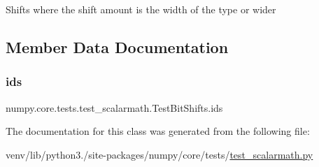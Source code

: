 \begin{DoxyVerb}Shifts where the shift amount is the width of the type or wider \end{DoxyVerb}
 

\subsection{Member Data Documentation}
\mbox{\label{classnumpy_1_1core_1_1tests_1_1test__scalarmath_1_1TestBitShifts_acc63f48bcaf360b96a391e99e02ba415}} 
\subsubsection{\texorpdfstring{ids}{ids}}
{\footnotesize\ttfamily numpy.\+core.\+tests.\+test\+\_\+scalarmath.\+Test\+Bit\+Shifts.\+ids\hspace{0.3cm}{\ttfamily [static]}}



The documentation for this class was generated from the following file\+:\begin{DoxyCompactItemize}
\item 
venv/lib/python3./site-\/packages/numpy/core/tests/\hyperlink{test__scalarmath_8py}{test\+\_\+scalarmath.\+py}\end{DoxyCompactItemize}
